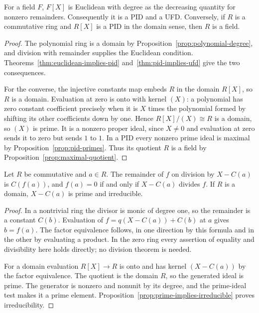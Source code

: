 \begin{theorem}\label{thm:field-polynomial-pid}
For a field $F$, $F[X]$ is Euclidean with degree as the decreasing
quantity for nonzero remainders. Consequently it is a PID and a UFD.
Conversely, if $R$ is a commutative ring and $R[X]$ is a PID in the
domain sense, then $R$ is a field.
\end{theorem}
\begin{proof}
The polynomial ring is a domain by Proposition~\ref{prop:polynomial-degree},
and division with remainder supplies the Euclidean condition.
Theorems~\ref{thm:euclidean-implies-pid} and~\ref{thm:pid-implies-ufd}
give the two consequences.

For the converse, the injective constants map embeds $R$ in the
domain $R[X]$, so $R$ is a domain. Evaluation at zero is onto with
kernel $(X)$: a polynomial has zero constant coefficient precisely
when it is $X$ times the polynomial formed by shifting its other
coefficients down by one. Hence $R[X]/(X)\cong R$ is a domain,
so $(X)$ is prime. It is a nonzero proper ideal, since $X\ne0$
and evaluation at zero sends it to zero but sends $1$ to $1$.
In a PID every nonzero prime ideal is maximal by
Proposition~\ref{prop:pid-primes}. Thus its quotient $R$ is a field
by Proposition~\ref{prop:maximal-quotient}.
\end{proof}

\begin{proposition}\label{prop:factor-remainder}
Let $R$ be commutative and $a\in R$. The remainder of $f$ on division
by $X-C(a)$ is $C(f(a))$, and
$f(a)=0$ if and only if $X-C(a)$ divides $f$.
If $R$ is a domain, $X-C(a)$ is prime and irreducible.
\end{proposition}
\begin{proof}
In a nontrivial ring the divisor is monic of degree one, so the remainder
is a constant $C(b)$. Evaluation of
$f=q(X-C(a))+C(b)$ at $a$ gives $b=f(a)$. The factor equivalence
follows, in one direction by this formula and in the other by evaluating
a product. In the zero ring every assertion of equality and divisibility
here holds directly; no division theorem is needed.

For a domain evaluation $R[X]\to R$ is onto and has kernel
$(X-C(a))$ by the factor equivalence. The quotient is the domain $R$,
so the generated ideal is prime. The generator is nonzero and nonunit
by its degree, and the prime-ideal test makes it a prime element.
Proposition~\ref{prop:prime-implies-irreducible} proves irreducibility.
\end{proof}

